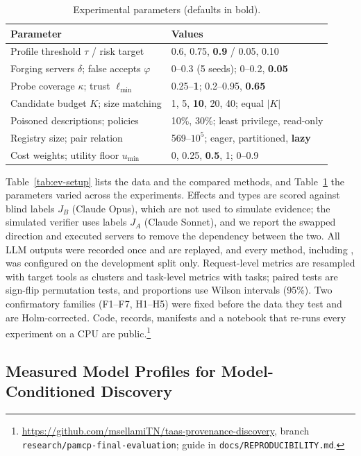 \begin{table}[t]
\centering
\caption{Experimental parameters (defaults in bold).}
\label{tab:ev-params}
\scriptsize
\setlength{\tabcolsep}{2.5pt}
\begin{tabular}{@{}lp{4.3cm}@{}}
\toprule
Parameter & Values \\
\midrule
Profile threshold $\tau$ / risk target & 0.6, 0.75, \textbf{0.9} / 0.05, 0.10 \\
Forging servers $\delta$; false accepts $\varphi$ & 0--0.3 (5 seeds); 0--0.2, \textbf{0.05} \\
Probe coverage $\kappa$; trust $\ell_{\min}$ & 0.25--\textbf{1}; 0.2--0.95, \textbf{0.65} \\
Candidate budget $K$; size matching & 1, 5, \textbf{10}, 20, 40; equal $|K|$ \\
Poisoned descriptions; policies & 10\%, 30\%; least privilege, read-only \\
Registry size; pair relation & 569--$10^5$; eager, partitioned, \textbf{lazy} \\
Cost weights; utility floor $u_{\min}$ & 0, 0.25, \textbf{0.5}, 1; 0--0.9 \\
\bottomrule
\end{tabular}
\end{table}

Table~\ref{tab:ev-setup} lists the data and the compared methods, and Table~\ref{tab:ev-params} the parameters
varied across the experiments. Effects and types are scored against blind labels $J_B$ (Claude Opus), which are
not used to simulate evidence; the simulated verifier uses labels $J_A$ (Claude Sonnet), and we report the
swapped direction and executed servers to remove the dependency between the two. All LLM outputs were recorded
once and are replayed, and every method, including \pamcp{}, was configured on the development split only.
Request-level metrics are resampled with target tools as clusters and task-level metrics with tasks; paired tests
are sign-flip permutation tests, and proportions use Wilson intervals (95\%). Two confirmatory families (F1--F7,
H1--H5) were fixed before the data they test and are Holm-corrected. Code, records, manifests and a notebook that
re-runs every experiment on a CPU are public.\footnote{\url{https://github.com/msellamiTN/taas-provenance-discovery},
branch \texttt{research/pamcp-final-evaluation}; guide in \texttt{docs/REPRODUCIBILITY.md}.}

\subsection{Measured Model Profiles for Model-Conditioned Discovery}
\label{sec:ev-rq1}


